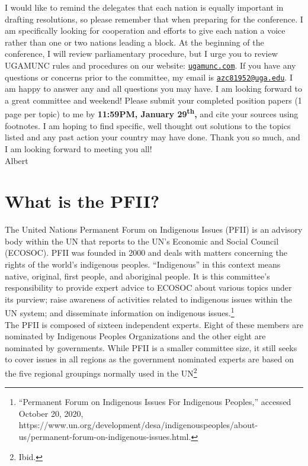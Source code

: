 \documentclass[10pt, letterpaper]{article}
\begin{document}
I would like to remind the delegates that each nation is equally
important in drafting resolutions, so please remember that when
preparing for the conference. I am specifically looking for cooperation
and efforts to give each nation a voice rather than one or two nations
leading a block. At the beginning of the conference, I will review
parliamentary procedure, but I urge you to review UGAMUNC rules and
procedures on our website:
\texttt{\href{https://www.ugamunc.com/}{{ugamunc.com}}}. If you have
any questions or concerns prior to the committee, my email is
\texttt{\href{mailto:azc81952@uga.edu}{{azc81952@uga.edu}}}. I am happy
to answer any and all questions you may have. I am looking forward to a
great committee and weekend! Please submit your completed position
papers (1 page per topic) to me by \textbf{11:59PM, January
29\textsuperscript{th},} and cite your sources using footnotes. I am
hoping to find specific, well thought out solutions to the topics listed
and any past action your country may have done. Thank you so much, and I
am looking forward to meeting you all! \\

Albert

\newpage
\tableofcontents
\newpage

\section{{What is the PFII?}}

The United Nations Permanent Forum on Indigenous Issues (PFII) is an
advisory body within the UN that reports to the UN's Economic and Social
Council (ECOSOC). PFII was founded in 2000 and deals with matters
concerning the rights of the world's indigenous peoples. ``Indigenous''
in this context means native, original, first people, and aboriginal
people. It is this committee's responsibility to provide expert advice
to ECOSOC about various topics under its purview; raise awareness of
activities related to indigenous issues within the UN system; and
disseminate information on indigenous issues.\footnote{``Permanent Forum
  on Indigenous Issues For Indigenous Peoples,'' accessed October 20,
  2020,
  https://www.un.org/development/desa/indigenouspeoples/about-us/permanent-forum-on-indigenous-issues.html.} \\

The PFII is composed of sixteen independent experts. Eight of these
members are nominated by Indigenous Peoples Organizations and the other
eight are nominated by governments. While PFII is a smaller committee
size, it still seeks to cover issues in all regions as the government
nominated experts are based on the five regional groupings normally used
in the UN\footnote{Ibid.} \\
\end{document}
